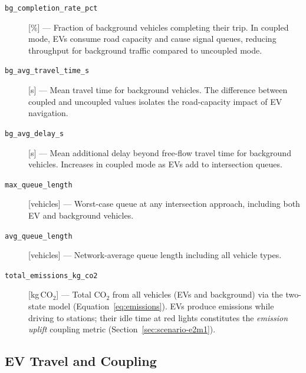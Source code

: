 \begin{description}

\item[\texttt{bg\_completion\_rate\_pct}] [\%] ---
  Fraction of background vehicles completing their trip.  In coupled mode, EVs
  consume road capacity and cause signal queues, reducing throughput for
  background traffic compared to uncoupled mode.

\item[\texttt{bg\_avg\_travel\_time\_s}] [s] ---
  Mean travel time for background vehicles.  The difference between coupled and
  uncoupled values isolates the road-capacity impact of EV navigation.

\item[\texttt{bg\_avg\_delay\_s}] [s] ---
  Mean additional delay beyond free-flow travel time for background vehicles.
  Increases in coupled mode as EVs add to intersection queues.

\item[\texttt{max\_queue\_length}] [vehicles] ---
  Worst-case queue at any intersection approach, including both EV and
  background vehicles.

\item[\texttt{avg\_queue\_length}] [vehicles] ---
  Network-average queue length including all vehicle types.

\item[\texttt{total\_emissions\_kg\_co2}] [kg\,CO$_2$] ---
  Total CO$_2$ from all vehicles (EVs and background) via the two-state model
  (Equation~\ref{eq:emissions}).  EVs produce emissions while driving to
  stations; their idle time at red lights constitutes the \emph{emission
  uplift} coupling metric (Section~\ref{sec:scenario-e2m1}).

\end{description}

\subsection*{EV Travel and Coupling}

